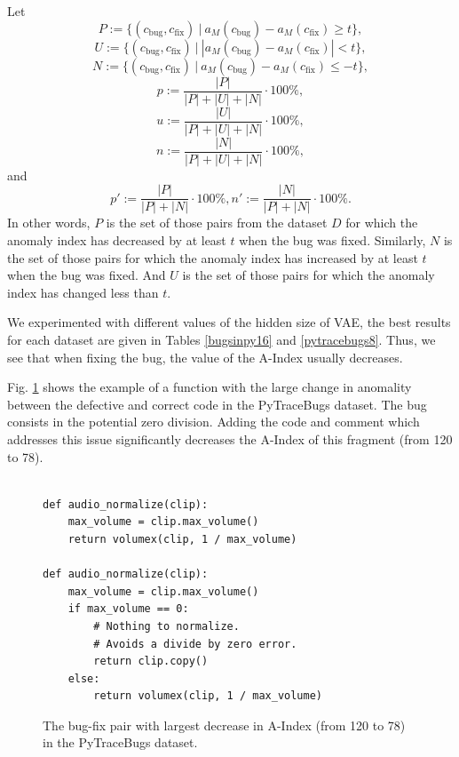 \documentclass[10pt,conference]{IEEEtran}
\begin{document}
Let $$P := \{(c_{\mathrm{bug}}, c_{\mathrm{fix}}) ~\big|~ a_M(c_{\mathrm{bug}}) - a_M(c_{\mathrm{fix}}) \geq t\},$$
    $$U := \{(c_{\mathrm{bug}}, c_{\mathrm{fix}}) ~\big|~ |a_M(c_{\mathrm{bug}}) - a_M(c_{\mathrm{fix}})| < t\},$$
    $$N := \{(c_{\mathrm{bug}}, c_{\mathrm{fix}}) ~\big|~ a_M(c_{\mathrm{bug}}) - a_M(c_{\mathrm{fix}}) \leq -t\},$$
    $$p := \frac{|P|}{|P| + |U| + |N|} \cdot 100\%,$$
    $$u := \frac{|U|}{|P| + |U| + |N|} \cdot 100\%,$$
    $$n := \frac{|N|}{|P| + |U| + |N|} \cdot 100\%,$$
and $$p':= \frac{|P|}{|P| + |N|} \cdot 100\%, n':= \frac{|N|}{|P| + |N|} \cdot 100\%.$$
In other words, $P$ is the set of those pairs from the dataset $D$ for which the anomaly index has decreased by at least $t$
 when the bug was fixed.
Similarly, $N$ is the set of those pairs for which the anomaly index has increased by at least $t$
 when the bug was fixed.
And $U$ is the set of those pairs for which the anomaly index has changed less than $t$.

We experimented with different values of the hidden size of VAE,
 the best results for each dataset are given in Tables \ref{bugsinpy16} and \ref{pytracebugs8}.
Thus, we see that when fixing the bug, the value of the {\sc A-Index} usually decreases.

Fig. \ref{six} shows the example of a function with the large change in anomality between the defective and correct code in the PyTraceBugs dataset. The bug consists in the potential zero division. Adding the code and comment which addresses this issue significantly decreases the {\sc A-Index} of this fragment (from 120 to 78).

\begin{figure}%
\caption{The bug-fix pair with largest decrease in {\sc A-Index} (from 120 to 78) in the PyTraceBugs dataset.}
\label{six}
\begin{verbatim}

def audio_normalize(clip):
    max_volume = clip.max_volume()
    return volumex(clip, 1 / max_volume)
    
def audio_normalize(clip):
    max_volume = clip.max_volume()
    if max_volume == 0:
        # Nothing to normalize.
        # Avoids a divide by zero error.
        return clip.copy()
    else:
        return volumex(clip, 1 / max_volume)
\end{verbatim}
\end{figure}
\end{document}
